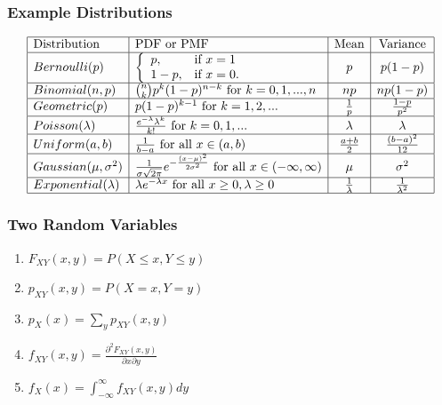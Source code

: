 \documentclass{beamer}
\begin{document}
\begin{frame}
\frametitle{Example Distributions}
\begin{center}
\small
$$\begin{array}{|l|l|c|c|}
\hline
\text{Distribution} & \text{PDF or PMF} & \text{Mean} & \text{Variance} \\ 
\hline
Bernoulli(p) & \left\{\begin{array}{ll}p,&\text{if }x=1\\1-p,&\text{if }x=0.\end{array}\right. & p & p(1-p) \\ 
\hline
Binomial(n,p) & \binom{n}{k}p^k(1-p)^{n-k}\text{ for }k=0,1,...,n & np & np(1-p) \\ 
\hline
Geometric(p) & p(1-p)^{k-1}\text{ for }k=1,2,... & \frac1p & \frac{1-p}{p^2} \\ 
\hline
Poisson(\lambda) & \frac{e^{-\lambda}\lambda^k}{k!}\text{ for }k=0,1,... & \lambda & \lambda \\ 
\hline
Uniform(a,b) & \frac{1}{b-a}\text{ for all } x\in(a,b) & \frac{a+b}{2} & \frac{(b-a)^2}{12} \\ 
\hline
Gaussian(\mu,\sigma^2) & \frac{1}{\sigma\sqrt{2\pi}}e^{-\frac{(x-\mu)^2}{2\sigma^2}}\text{ for all } x\in(-\infty, \infty) & \mu & \sigma^2 \\ 
\hline
Exponential(\lambda) & \lambda e^{-\lambda x}\text{ for all } x\geq 0, \lambda\geq 0 & \frac{1}{\lambda} & \frac{1}{\lambda^2}\\
\hline
\end{array} $$
\end{center}
\end{frame}
\begin{frame}
\frametitle{Two Random Variables}
\begin{enumerate}
\itemsep2em
\item $F_{XY}(x,y)=P(X\leq x,Y\leq y)$
\item $p_{XY}(x,y)=P(X=x,Y=y)$
\item $p_X(x)=\sum_yp_{XY}(x,y)$
\item $f_{XY}(x,y)=\frac{\partial^2 F_{XY}(x,y)}{\partial x\partial y}$
\item $f_X(x)=\int_{-\infty}^{\infty}f_{XY}(x,y)dy$
\end{enumerate}
\end{frame}
\end{document}
